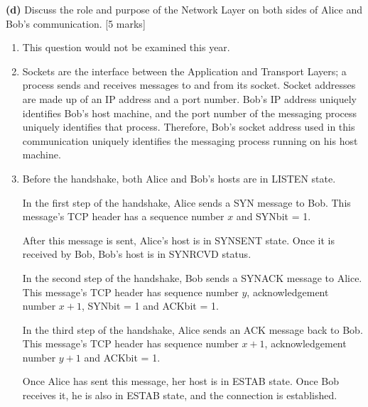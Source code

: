 \textbf{(d)}
Discuss the role and purpose of the Network Layer on both sides of Alice and Bob’s communication. \hfill [5 marks]
{\color{blue}
\begin{enumerate}[label=(\alph*)]
    \item This question would not be examined this year.

    \item Sockets are the interface between the Application and Transport Layers; a process sends and receives messages to and from its socket. Socket addresses are made up of an IP address and a port number. Bob’s IP address uniquely identifies Bob’s host machine, and the port number of the messaging process uniquely identifies that process. Therefore, Bob’s socket address used in this communication uniquely identifies the messaging process running on his host machine.

    \item Before the handshake, both Alice and Bob’s hosts are in LISTEN state.

    In the first step of the handshake, Alice sends a SYN message to Bob. This message’s TCP header has a sequence number $x$ and SYNbit = 1.

    After this message is sent, Alice’s host is in SYNSENT state. Once it is received by Bob, Bob’s host is in SYNRCVD status.

    In the second step of the handshake, Bob sends a SYNACK message to Alice. This message’s TCP header has sequence number $y$, acknowledgement number $x+1$, SYNbit = 1 and ACKbit = 1.

    In the third step of the handshake, Alice sends an ACK message back to Bob. This message’s TCP header has sequence number $x+1$, acknowledgement number $y+1$ and ACKbit = 1.

    Once Alice has sent this message, her host is in ESTAB state. Once Bob receives it, he is also in ESTAB state, and the connection is established.


\end{enumerate}}
